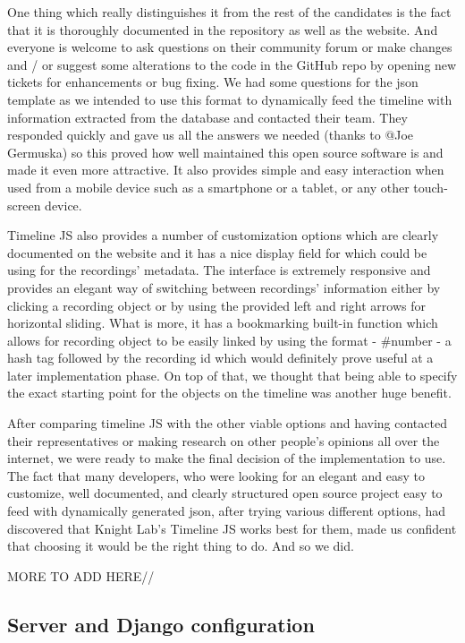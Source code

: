 \documentclass{l3proj}
\begin{document}
One thing which really distinguishes it from the rest of the candidates is the fact that it is thoroughly documented in the repository as well as the website. And everyone is welcome to ask questions on their community forum or make changes and / or suggest some alterations to the code in the GitHub repo by opening new tickets for enhancements or bug fixing. We had some questions for the json template as we intended to use this format to dynamically feed the timeline with information extracted from the database and contacted their team. They responded quickly and gave us all the answers we needed (thanks to @Joe Germuska) so this proved how well maintained this open source software is and made it even more attractive. It also provides simple and easy interaction when used from a mobile device such as a smartphone or a tablet, or any other touch-screen device.

Timeline JS also provides a number of customization options which are clearly documented on the website and it has a nice display field for which could be using for the recordings’ metadata. The interface is extremely responsive and provides an elegant way of switching between recordings’ information either by clicking a recording object or by using the provided left and right arrows for horizontal sliding. What is more, it has a bookmarking built-in function which allows for recording object to be easily linked by using the format - #number - a hash tag followed by the recording id which would definitely prove useful at a later implementation phase. On top of that, we thought that being able to specify the exact starting point for the objects on the timeline was another huge benefit.

After comparing timeline JS with the other viable options and having contacted their representatives or making research on other people’s opinions all over the internet, we were ready to make the final decision of the implementation to use. The fact that many developers, who were looking for an elegant and easy to customize, well documented, and clearly structured open source project easy to feed with dynamically generated json, after trying various different options, had discovered that Knight Lab’s Timeline JS works best for them, made us confident that choosing it would be the right thing to do. And so we did.


MORE TO ADD HERE//



\subsection{Server and Django configuration}
\end{document}
